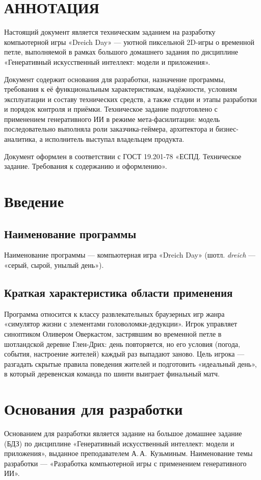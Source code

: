 \documentclass[12pt]{article}
\begin{document}

\section*{\centering АННОТАЦИЯ}
Настоящий документ является техническим заданием на разработку компьютерной игры «Dreich Day» — уютной пиксельной 2D-игры о временной петле, выполняемой в рамках большого домашнего задания по дисциплине «Генеративный искусственный интеллект: модели и приложения».

Документ содержит основания для разработки, назначение программы, требования к её функциональным характеристикам, надёжности, условиям эксплуатации и составу технических средств, а также стадии и этапы разработки и порядок контроля и приёмки. Техническое задание подготовлено с применением генеративного ИИ в режиме мета-фасилитации: модель последовательно выполняла роли заказчика-геймера, архитектора и бизнес-аналитика, а исполнитель выступал владельцем продукта.

Документ оформлен в соответствии с ГОСТ 19.201-78 «ЕСПД. Техническое задание. Требования к содержанию и оформлению».
\clearpage
\tableofcontents
\clearpage

\section{Введение}
\subsection{Наименование программы}
Наименование программы — компьютерная игра «Dreich Day» (шотл. \textit{dreich} — «серый, сырой, унылый день»).
\subsection{Краткая характеристика области применения}
Программа относится к классу развлекательных браузерных игр жанра «симулятор жизни с элементами головоломки-дедукции». Игрок управляет синоптиком Оливером Оверкастом, застрявшим во временной петле в шотландской деревне Глен-Дрих: день повторяется, но его условия (погода, события, настроение жителей) каждый раз выпадают заново. Цель игрока — разгадать скрытые правила поведения жителей и подготовить «идеальный день», в который деревенская команда по шинти выиграет финальный матч.

\section{Основания для разработки}
Основанием для разработки является задание на большое домашнее задание (БДЗ) по дисциплине «Генеративный искусственный интеллект: модели и приложения», выданное преподавателем А.\,А.~Кузьминым. Наименование темы разработки — «Разработка компьютерной игры с применением генеративного ИИ».
\end{document}
